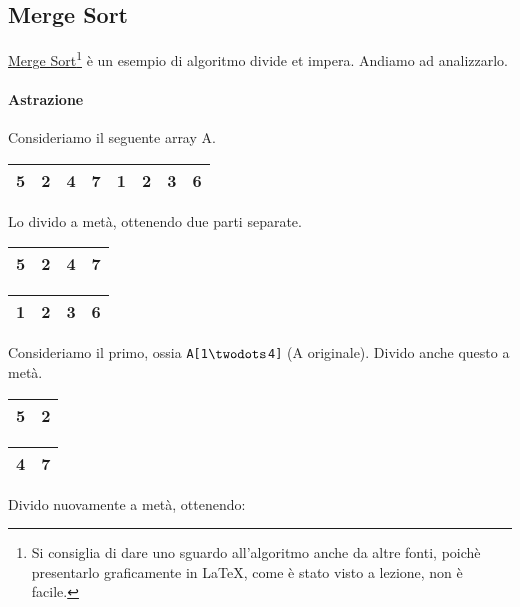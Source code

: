 \subsection{Merge Sort}
\href{https://en.wikipedia.org/wiki/Merge_sort}{Merge Sort}\footnote{Si %
consiglia di dare uno sguardo all'algoritmo anche da altre fonti, poichè presentarlo %
graficamente in \LaTeX, come è stato visto a lezione, non è facile.} è un 
esempio di algoritmo divide et impera. Andiamo ad analizzarlo.

\paragraph{Astrazione} Consideriamo il seguente array A.
\begin{center}
	\begin{tabular}{|l|l|l|l||l|l|l|l|}
		\hline
		5 & 2 & 4 & 7 & 1 & 2 & 3 & 6 \\
		\hline
	\end{tabular}
\end{center}

Lo divido a metà, ottenendo due parti separate.

\begin{center}
	\begin{tabular}{|l|l|l|l|}
		\hline
		5 & 2 & 4 & 7 \\
		\hline
	\end{tabular}
	\hspace{1cm}
	\begin{tabular}{|l|l|l|l|}
		\hline
		1 & 2 & 3 & 6 \\
		\hline
	\end{tabular}
\end{center}

Consideriamo il primo, ossia \texttt{A[1$\twodots$4]} (A originale). Divido anche questo a metà.

\begin{center}
	\begin{tabular}{|l|l|}
		\hline
		5 & 2 \\
		\hline
	\end{tabular}
	\hspace{1cm}
	\begin{tabular}{|l|l|}
		\hline
		4 & 7 \\
		\hline
	\end{tabular}
\end{center}

Divido nuovamente a metà, ottenendo:

